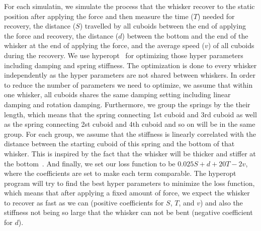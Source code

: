 For each simulatin, we simulate the process that the whisker recover to the static position after applying the force and then measure the time ($T$) needed for recovery, the distance ($S$) travelled by all cuboids between the end of applying the force and recovery, the distance ($d$) between the bottom and the end of the whisker at the end of applying the force, and the average speed ($v$) of all cuboids during the recovery. 
We use hyperopt~\cite{bergstra2013hyperopt} for optimizing those hyper parameters including damping and spring stiffness. The optimization is done to every whisker independently as the hyper parameters are not shared between whiskers.
In order to reduce the number of parameters we need to optimize, we assume that within one whisker, all cuboids shares the same damping setting including linear damping and rotation damping. 
Furthermore, we group the springs by the their length, which means that the spring connecting 1st cuboid and 3rd cuboid as well as the spring connecting 2st cuboid and 4th cuboid and so on will be in the same group. 
For each group, we assume that the stiffness is linearly correlated with the distance between the starting cuboid of this spring and the bottom of that whisker.
This is inspired by the fact that the whisker will be thicker and stiffer at the bottom~\cite{Hartmann:2015}.
And finally, we set our loss function to be $0.025S + d + 20T - 2v$, where the coefficients are set to make each term comparable.
The hyperopt program will try to find the best hyper parameters to minimize the loss function, which means that after applying a fixed amount of force, we expect the whisker to recover as fast as we can (positive coefficients for $S$, $T$, and $v$) and also the stiffness not being so large that the whisker can not be bent (negative coefficient for $d$).
